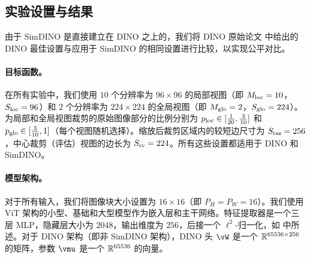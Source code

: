 \documentclass[../../book-main_zh.tex]{subfiles}
\begin{document}
\subsection{实验设置与结果} \label{sub:contrastive_learning_experiment_results}

由于 SimDINO 是直接建立在 DINO 之上的，我们将 DINO 原始论文 \citep{caron2021emerging} 中给出的 DINO 最佳设置与应用于 SimDINO 的相同设置进行比较，以实现公平对比。

\paragraph{目标函数。} 在所有实验中，我们使用 \(10\) 个分辨率为 \(96 \times 96\) 的局部视图（即 \(M_{\mathrm{loc}} = 10\)，\(S_{\mathrm{loc}} = 96\)）和 \(2\) 个分辨率为 \(224 \times 224\) 的全局视图（即 \(M_{\mathrm{glo}} = 2\)，\(S_{\mathrm{glo}} = 224\)）。为局部和全局视图裁剪的原始图像部分的比例分别为 \(p_{\mathrm{loc}} \in [\frac{1}{20}, \frac{3}{10}]\) 和 \(p_{\mathrm{glo}} \in [\frac{3}{10}, 1]\)（每个视图随机选择）。缩放后裁剪区域内的较短边尺寸为 \(S_{\mathrm{rsz}} = 256\)，中心裁剪（评估）视图的边长为 \(S_{\mathrm{cc}} = 224\)。所有这些设置都适用于 DINO 和 SimDINO。

\paragraph{模型架构。} 对于所有输入，我们将图像块大小设置为 \(16 \times 16\)（即 \(P_{H} = P_{W} = 16\)）。我们使用 ViT \citep{dosovitskiy2020image} 架构的小型、基础和大型模型作为嵌入层和主干网络。特征提取器是一个三层 MLP，隐藏层大小为 \(2048\)，输出维度为 \(256\)，后接一个 \(\ell^{2}\)-归一化，如  中所述。对于 DINO 架构（即非 SimDINO 架构），DINO 头 \(\vW\) 是一个 \(\mathbb{R}^{65536 \times 256}\) 的矩阵，参数 \(\vmu\) 是一个 \(\mathbb{R}^{65536}\) 的向量。
\end{document}
